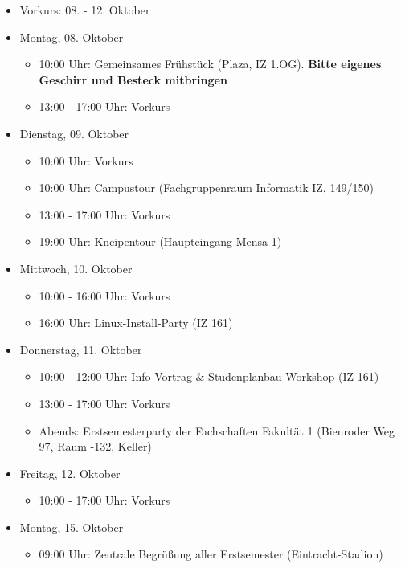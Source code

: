 \begin{itemize}
    \item Vorkurs: 08. - 12. Oktober
    \item Montag, 08. Oktober
        \begin{itemize}
            \item 10:00 Uhr: Gemeinsames Frühstück (Plaza, IZ 1.OG). \textbf{Bitte eigenes Geschirr und Besteck mitbringen}
            \item 13:00 - 17:00 Uhr: Vorkurs
        \end{itemize}
    \item Dienstag, 09. Oktober
        \begin{itemize}
            \item 10:00 Uhr: Vorkurs
            \item 10:00 Uhr: Campustour (Fachgruppenraum Informatik IZ, 149/150)
            \item 13:00 - 17:00 Uhr: Vorkurs
            \item 19:00 Uhr: Kneipentour (Haupteingang Mensa 1)
        \end{itemize}
    \item Mittwoch, 10. Oktober
        \begin{itemize}
            \item 10:00 - 16:00 Uhr: Vorkurs
            \item 16:00 Uhr: Linux-Install-Party (IZ 161)
        \end{itemize}
    \item Donnerstag, 11. Oktober
        \begin{itemize}
            \item 10:00 - 12:00 Uhr: Info-Vortrag \& Studenplanbau-Workshop (IZ 161)
            \item 13:00 - 17:00 Uhr: Vorkurs
            \item Abends: Erstsemesterparty der Fachschaften Fakultät 1 (Bienroder Weg 97, Raum -132, Keller)
        \end{itemize}
    \item Freitag, 12. Oktober
        \begin{itemize}
            \item 10:00 - 17:00 Uhr: Vorkurs
        \end{itemize}
    \item Montag, 15. Oktober
        \begin{itemize}
            \item 09:00 Uhr: Zentrale Begrüßung aller Erstsemester (Eintracht-Stadion)

\end{itemize}
\end{itemize}
